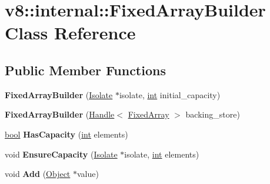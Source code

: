 \hypertarget{classv8_1_1internal_1_1FixedArrayBuilder}{}\section{v8\+:\+:internal\+:\+:Fixed\+Array\+Builder Class Reference}
\label{classv8_1_1internal_1_1FixedArrayBuilder}
\subsection*{Public Member Functions}
\begin{DoxyCompactItemize}
\item 
\mbox{\label{classv8_1_1internal_1_1FixedArrayBuilder_a462566e1ff69ae42b59bc374a2692147}} 
{\bfseries Fixed\+Array\+Builder} (\mbox{\hyperlink{classv8_1_1internal_1_1Isolate}{Isolate}} $\ast$isolate, \mbox{\hyperlink{classint}{int}} initial\+\_\+capacity)
\item 
\mbox{\label{classv8_1_1internal_1_1FixedArrayBuilder_a6a1999869a5363ea5ba6b8586b2aeb1b}} 
{\bfseries Fixed\+Array\+Builder} (\mbox{\hyperlink{classv8_1_1internal_1_1Handle}{Handle}}$<$ \mbox{\hyperlink{classv8_1_1internal_1_1FixedArray}{Fixed\+Array}} $>$ backing\+\_\+store)
\item 
\mbox{\label{classv8_1_1internal_1_1FixedArrayBuilder_aa610027ce4b3aca54fdb05cbb9492aed}} 
\mbox{\hyperlink{classbool}{bool}} {\bfseries Has\+Capacity} (\mbox{\hyperlink{classint}{int}} elements)
\item 
\mbox{\label{classv8_1_1internal_1_1FixedArrayBuilder_a33881c8c314e554c6daf92d4a7c74be1}} 
void {\bfseries Ensure\+Capacity} (\mbox{\hyperlink{classv8_1_1internal_1_1Isolate}{Isolate}} $\ast$isolate, \mbox{\hyperlink{classint}{int}} elements)
\item 
\mbox{\label{classv8_1_1internal_1_1FixedArrayBuilder_afbadceee85a2b4bbe7db9a5479f92bc1}} 
void {\bfseries Add} (\mbox{\hyperlink{classv8_1_1internal_1_1Object}{Object}} $\ast$value)
\item 
\mbox{\label{classv8_1_1internal_1_1FixedArrayBuilder_afc00b86e41fe0fd5514f0518b463516e}} 

\end{DoxyCompactItemize}
